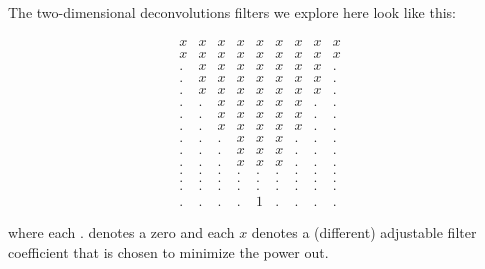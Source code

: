 \par
The two-dimensional deconvolutions filters
we explore here
look like this:

\begin{equation}
   \begin{array}{ccccccccc}
                 x& x& x& x& x& x& x& x& x \\
                 x& x& x& x& x& x& x& x& x \\
                 .& x& x& x& x& x& x& x& . \\
                 .& x& x& x& x& x& x& x& . \\
                 .& x& x& x& x& x& x& x& . \\
                 .& .& x& x& x& x& x& .& . \\
                 .& .& x& x& x& x& x& .& . \\
                 .& .& x& x& x& x& x& .& . \\
                 .& .& .& x& x& x& .& .& . \\
                 .& .& .& x& x& x& .& .& . \\
                 .& .& .& x& x& x& .& .& . \\
                 .& .& .& .& .& .& .& .& . \\
                 .& .& .& .& .& .& .& .& . \\
                 .& .& .& .& .& .& .& .& . \\
                 .& .& .& .& 1& .& .& .& .
      \end{array}
\end{equation}


\noindent
where each $.$ denotes a zero and each
$x$ denotes a (different) adjustable filter coefficient
that is chosen to minimize the power out.

